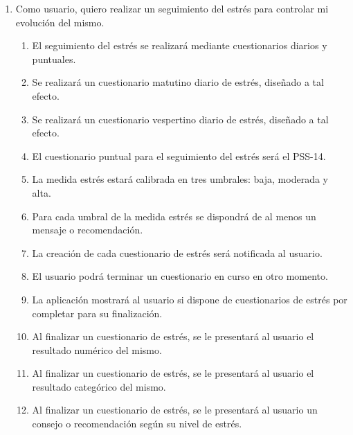         \begin{enumerate}[series=req-usuario,label=\textbf{\texttt{RU-\arabic*}}]
            \item Como usuario, quiero realizar un seguimiento del estrés para controlar mi evolución del mismo.
            \begin{enumerate}[series=req-funcionales,label=\textbf{\texttt{RF-\arabic*}}]
                \item El seguimiento del estrés se realizará mediante cuestionarios diarios y puntuales.
                \item Se realizará un cuestionario matutino diario de estrés, diseñado a tal efecto.
                \item Se realizará un cuestionario vespertino diario de estrés, diseñado a tal efecto.
                \item El cuestionario puntual para el seguimiento del estrés será el PSS-14.
                \item La medida estrés estará calibrada en tres umbrales: baja, moderada y alta.
                \item Para cada umbral de la medida estrés se dispondrá de al menos un mensaje o recomendación.
                \item La creación de cada cuestionario de estrés será notificada al usuario.
                \item El usuario podrá terminar un cuestionario en curso en otro momento.
                \item La aplicación mostrará al usuario si dispone de cuestionarios de estrés por completar para su finalización.
                \item Al finalizar un cuestionario de estrés, se le presentará al usuario el resultado numérico del mismo.
                \item Al finalizar un cuestionario de estrés, se le presentará al usuario el resultado categórico del mismo.
                \item Al finalizar un cuestionario de estrés, se le presentará al usuario un consejo o recomendación según su nivel de estrés.
            \end{enumerate}
        \end{enumerate}
